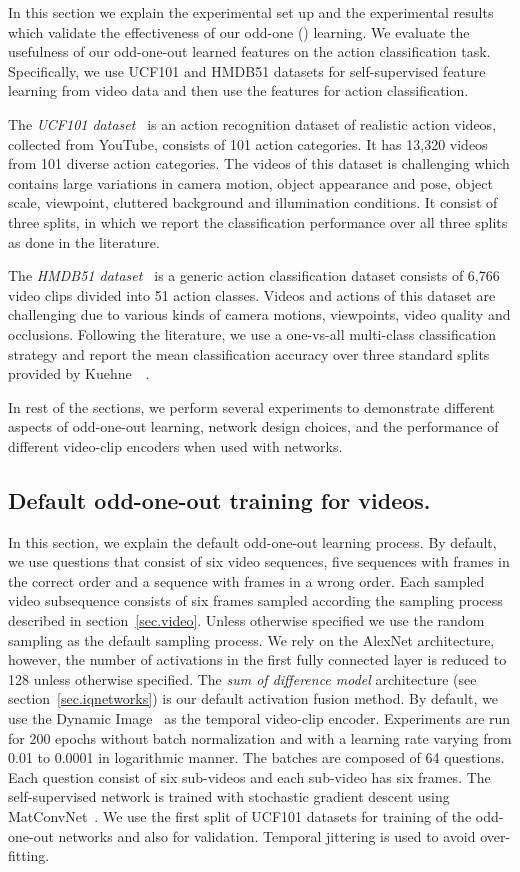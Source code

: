 In this section we explain the experimental set up and the experimental results which validate the effectiveness of our odd-one () learning. 
We evaluate the usefulness of our odd-one-out learned features on the action classification task. 
Specifically, we use UCF101 and HMDB51 datasets for self-supervised feature learning from video data and then use the features for action classification.

The \textit{UCF101 dataset~\cite{soomro2012ucf101}} is an action recognition dataset of realistic action videos, collected from YouTube, consists of 101 action categories. It has 13,320 videos from 101 diverse action categories. The videos of this dataset is challenging which contains large variations in camera motion, object appearance and pose, object scale, viewpoint, cluttered background and illumination conditions. It consist of three splits, in which we report the classification performance over all three splits as done in the literature.

The \textit{HMDB51 dataset~\cite{Kuehne2011}} is a generic action classification dataset consists of 6,766 video clips divided into 51 action classes. Videos and actions of this dataset are challenging due to various kinds of camera motions, viewpoints, video quality and occlusions. Following the literature, we use a one-vs-all multi-class classification strategy and report the mean classification accuracy over three standard splits provided by Kuehne~\etal~\cite{Kuehne2011}.

In rest of the sections, we perform several experiments to demonstrate different aspects of odd-one-out learning, network design choices, and the performance of different video-clip encoders when used with  networks. 
\subsection{Default odd-one-out training for videos.}
In this section, we explain the default odd-one-out learning process.
By default, we use questions that consist of six video sequences, five sequences with frames in the correct order and a sequence with frames in a wrong order. 
Each sampled video subsequence consists of six frames sampled according the sampling process described in section~\ref{sec.video}. 
Unless otherwise specified we use the random sampling as the default sampling process. 
We rely on the AlexNet architecture, however, the number of activations in the first fully connected layer is reduced to 128 unless otherwise specified. 
The \emph{sum of difference model} architecture (see section~\ref{sec.iqnetworks}) is our default activation fusion method. 
By default, we use the Dynamic Image~\cite{Bilen2016} as the temporal video-clip encoder. 
Experiments are run for 200 epochs without batch normalization and with a learning rate varying from 0.01 to 0.0001 in logarithmic manner. The batches are composed of 64 questions. 
Each question consist of six sub-videos and each sub-video has six frames. 
The self-supervised network is trained with stochastic gradient descent using MatConvNet~\cite{Vedaldi2015}. We use the first split of UCF101 datasets for training of the odd-one-out networks and also for validation. 
Temporal jittering is used to avoid over-fitting.

